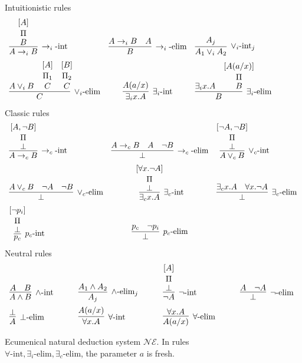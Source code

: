 \begin{figure}[htp]
{\sc Intuitionistic rules}
\[
\begin{array}{lc@{\quad}l}
\infer[{\iimp\mbox{-int}}]{ A\iimp B}
{\deduce{B}{\deduce{}{\deduce{\Pi}{\deduce{}{[A]}}}}} 
&
\infer[{\iimp\mbox{-elim}}]{B}{A\iimp B & A}
&
\infer[{\vee_i\mbox{-int}_j}]{ A_1\vee_i A_2}{ A_j}
\\[5pt]
\infer[{\vee_i\mbox{-elim}}]{C}{ A\vee_i B & \deduce{C}{\deduce{}{\deduce{\Pi_1}{\deduce{}{[A]}}}}
 &\deduce{C}{\deduce{}{\deduce{\Pi_2}{\deduce{}{[B]}}}}} 
&
\infer[\exists_i\mbox{-int}]{\exists_ix.A }{ A(a/x)}
&
\infer[\exists_i\mbox{-elim}]{ B}{ \exists_ix.A &  \deduce{B}{\deduce{}{\deduce{\Pi}{\deduce{}{[A(a/x)]}}}}}
\end{array}
\]
{\sc Classic rules}
\[
\begin{array}{lc@{\quad}l}
\infer[{\cimp\mbox{-int}}]{A\cimp B}
{\deduce{\bot}{\deduce{}{\deduce{\Pi}{\deduce{}{[A,\neg B]}}}}} 
&
\infer[{\cimp\mbox{-elim}}]{\bot}{ A\cimp B & A & \neg B}
&
\infer[{\vee_c\mbox{-int}}]{A\vee_c B}{\deduce{\bot}{\deduce{}{\deduce{\Pi}{\deduce{}{[\neg A,\neg B]}}}}} 
\\[5pt]
\infer[{\vee_c\mbox{-elim}}]{\bot}{A\vee_c B & \neg A &  \neg B} 
&
\infer[\exists_c\mbox{-int}]{ \exists_cx.A}{\deduce{\bot}{\deduce{}{\deduce{\Pi}{\deduce{}{[\forall x.\neg A]}}}}}
&
\infer[\exists_c\mbox{-elim}]{\bot}{ \exists_cx.A &  \forall x.\neg A}
\\[5pt]
\infer[p_c\mbox{-int}]{ p_c}{\deduce{\bot}{\deduce{}{\deduce{\Pi}{\deduce{}{[\neg p_i]}}}}}
&
\infer[p_c\mbox{-elim}]{ \bot}{p_c &  \neg p_i}
\end{array}
\]
{\sc Neutral rules}
\[
\begin{array}{lc@{\qquad}lc@{\qquad}lc@{\qquad}l}
\infer[{\wedge\mbox{-int}}]{A \wedge B}{A \quad  B} 
& &
\infer[{\wedge\mbox{-elim}_j}]{ A_j}{A_1\wedge A_2} 
& &
\infer[{\neg\mbox{-int}}]{\neg A}{\deduce{\bot}{\deduce{}{\deduce{\Pi}{\deduce{}{[A]}}}}}
& & 
\infer[{\neg\mbox{-elim}}]{\bot}{ A &  \neg A}
\\[5pt]
\infer[\bot\mbox{-elim}]{A}{ \bot}
& &
\infer[\forall\mbox{-int}]{ \forall x.A}{ A(a/x)}
& & 
\infer[\forall\mbox{-elim}]{A(a/x) }{\forall x.A}
\end{array}
\]

\caption{Ecumenical natural deduction system $\mathcal{NE}$.  In rules 
$\forall\mbox{-int}, \exists_i\mbox{-elim}, \exists_c\mbox{-elim}$, the parameter $a$ is fresh.}\label{fig:NE}
\end{figure}


